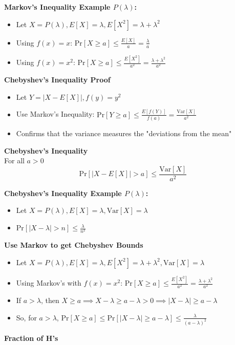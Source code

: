 \documentclass{article}\usepackage{amsmath,amssymb,amsthm,tikz,tkz-graph,color,chngpage,soul,hyperref,csquotes,graphicx,floatrow,listings, mathrsfs,framed,scrextend}\newcommand*{\QEDB}{\hfill\ensuremath{\square}}\newtheorem*{prop}{Proposition}\renewcommand{\theenumi}{\alph{enumi}}\usepackage[shortlabels]{enumitem}\usepackage[nobreak=true]{mdframed}\usetikzlibrary{matrix,calc}\MakeOuterQuote{"}\usepackage[margin=0.75in]{geometry} \newtheorem{theorem}{Theorem}
\newcommand{\x}[1]{\textrm{#1}}
\newcommand{\pr}[1]{\textrm{Pr}[#1]}
\newcommand{\eq}[1]{\begin{equation}#1\end{equation}}
\newcommand{\eqs}[1]{\begin{mdframed}#1\end{mdframed}}
\providecommand{\abs}[1]{\lvert#1\rvert} \providecommand{\norm}[1]{\lVert#1\rVert}
\newcommand{\items}[1]{\begin{itemize}#1\end{itemize}}
\newcommand{\E}[1]{E[#1]}
\newcommand{\var}[1]{\x{Var}[#1]}
\begin{document}
\textbf{Markov's Inequality Example $P(\lambda)$:}
\items{
    \item Let $X=P(\lambda), \E{X}=\lambda, \E{X^2}=\lambda+\lambda^2$
    \item Using $f(x)=x$: $\pr{X\ge a}\le\frac{\E{X}}{a}=\frac{\lambda}{a}$
    \item Using $f(x)=x^2$: $\pr{X\ge a}\le\frac{\E{X^2}}{a^2}=\frac{\lambda+\lambda^2}{a^2}$
}
\textbf{Chebyshev's Inequality Proof}
\items{
    \item Let $Y=\abs{X-\E{X}}, f(y)=y^2$
    \item Use Markov's Inequality: $\pr{Y\ge a}\le\frac{\E{f(Y)}}{f(a)}=\frac{\var{X}}{a^2}$
    \item Confirms that the variance measures the "deviations from the mean"
}
\eqs{
\textbf{Chebyshev's Inequality}\\
For all $a > 0$
\eq{\pr{\abs{X-\E{X}}>a}\le\frac{\var{X}}{a^2}}
}
\textbf{Chebyshev's Inequality Example $P(\lambda)$:}
\items{
    \item Let $X=P(\lambda), \E{X}=\lambda, \var{X}=\lambda$
    \item $\pr{\abs{X-\lambda}>n}\le\frac{\lambda}{n^2}$
}
\textbf{Use Markov to get Chebyshev Bounds}
\items{
    \item Let $X=P(\lambda), \E{X}=\lambda, \E{X^2}=\lambda+\lambda^2, \var{X}=\lambda$
    \item Using Markov's with $f(x)=x^2$: $\pr{X\ge a}\le\frac{\E{X^2}}{a^2}=\frac{\lambda+\lambda^2}{a^2}$
    \item If $a>\lambda$, then $X\ge a\implies X - \lambda \ge a-\lambda > 0 \implies \abs{X-\lambda}\ge a-\lambda$
    \item So, for $a>\lambda$, $\pr{X\ge a}\le\pr{\abs{X-\lambda}\ge a-\lambda}\le \frac{\lambda}{(a-\lambda)^2}$
    
}
\textbf{Fraction of H's}
\end{document}
